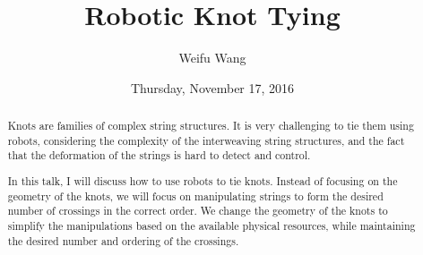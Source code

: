 \documentclass{UAmathtalk}
\author{Weifu Wang}
\title{Robotic Knot Tying}
\date{Thursday, November 17, 2016}
\begin{document}
\maketitle

\begin{abstract}
Knots are families of complex string structures. It is very challenging to tie them using robots, considering the complexity of the interweaving string structures, and the fact that the deformation of the strings is hard to detect and control.

In this talk, I will discuss how to use robots to tie knots. Instead of focusing on the geometry of the knots, we will focus on manipulating strings to form the desired number of crossings in the correct order. We change the geometry of the knots to simplify the manipulations based on the available physical resources, while maintaining the desired number and ordering of the crossings.
\end{abstract}
\end{document}

